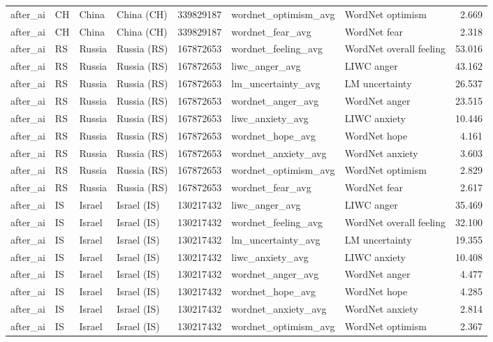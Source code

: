 \begin{tabular}{llllrllr}
after\_ai & CH & China & China (CH) & 339829187 & wordnet\_optimism\_avg & WordNet optimism & 2.669 \\
after\_ai & CH & China & China (CH) & 339829187 & wordnet\_fear\_avg & WordNet fear & 2.318 \\
after\_ai & RS & Russia & Russia (RS) & 167872653 & wordnet\_feeling\_avg & WordNet overall feeling & 53.016 \\
after\_ai & RS & Russia & Russia (RS) & 167872653 & liwc\_anger\_avg & LIWC anger & 43.162 \\
after\_ai & RS & Russia & Russia (RS) & 167872653 & lm\_uncertainty\_avg & LM uncertainty & 26.537 \\
after\_ai & RS & Russia & Russia (RS) & 167872653 & wordnet\_anger\_avg & WordNet anger & 23.515 \\
after\_ai & RS & Russia & Russia (RS) & 167872653 & liwc\_anxiety\_avg & LIWC anxiety & 10.446 \\
after\_ai & RS & Russia & Russia (RS) & 167872653 & wordnet\_hope\_avg & WordNet hope & 4.161 \\
after\_ai & RS & Russia & Russia (RS) & 167872653 & wordnet\_anxiety\_avg & WordNet anxiety & 3.603 \\
after\_ai & RS & Russia & Russia (RS) & 167872653 & wordnet\_optimism\_avg & WordNet optimism & 2.829 \\
after\_ai & RS & Russia & Russia (RS) & 167872653 & wordnet\_fear\_avg & WordNet fear & 2.617 \\
after\_ai & IS & Israel & Israel (IS) & 130217432 & liwc\_anger\_avg & LIWC anger & 35.469 \\
after\_ai & IS & Israel & Israel (IS) & 130217432 & wordnet\_feeling\_avg & WordNet overall feeling & 32.100 \\
after\_ai & IS & Israel & Israel (IS) & 130217432 & lm\_uncertainty\_avg & LM uncertainty & 19.355 \\
after\_ai & IS & Israel & Israel (IS) & 130217432 & liwc\_anxiety\_avg & LIWC anxiety & 10.408 \\
after\_ai & IS & Israel & Israel (IS) & 130217432 & wordnet\_anger\_avg & WordNet anger & 4.477 \\
after\_ai & IS & Israel & Israel (IS) & 130217432 & wordnet\_hope\_avg & WordNet hope & 4.285 \\
after\_ai & IS & Israel & Israel (IS) & 130217432 & wordnet\_anxiety\_avg & WordNet anxiety & 2.814 \\
after\_ai & IS & Israel & Israel (IS) & 130217432 & wordnet\_optimism\_avg & WordNet optimism & 2.367 \\

\end{tabular}
